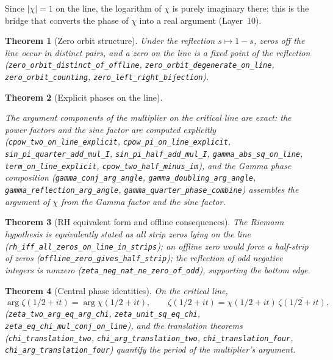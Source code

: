 \documentclass{article}
\newtheorem{theorem}{Theorem}[section]
\newcommand{\zt}{\zeta}
\newcommand{\Xchi}{\chi}
\begin{document}
Since $|\Xchi|=1$ on the line, the logarithm of $\Xchi$ is purely imaginary
there; this is the bridge that converts the phase of $\Xchi$ into a real
argument (Layer~10).

\begin{theorem}[Zero orbit structure]
\label{thm:orbit}
Under the reflection $s\mapsto 1-s$, zeros off the line occur in distinct
pairs, and a zero on the line is a fixed point of the reflection
(\texttt{zero\_orbit\_distinct\_of\_offline},
\texttt{zero\_orbit\_degenerate\_on\_line}, \texttt{zero\_orbit\_counting},
\texttt{zero\_left\_right\_bijection}).
\end{theorem}

\begin{theorem}[Explicit phases on the line]
\label{thm:explicit}
\begin{sloppypar}The argument components of the multiplier on the critical
line are exact: the power factors and the sine factor are computed
explicitly
(\texttt{cpow\_two\_on\_line\_explicit}, \texttt{cpow\_pi\_on\_line\_explicit},
\texttt{sin\_pi\_quarter\_add\_mul\_I}, \texttt{sin\_pi\_half\_add\_mul\_I},
\texttt{gamma\_abs\_sq\_on\_line}, \texttt{term\_on\_line\_explicit},
\texttt{cpow\_two\_half\_minus\_im}), and the Gamma phase composition
(\texttt{gamma\_conj\_arg\_angle}, \texttt{gamma\_doubling\_arg\_angle},
\texttt{gamma\_reflection\_arg\_angle}, \texttt{gamma\_quarter\_phase\_combine})
assembles the argument of $\Xchi$ from the Gamma factor and the sine
factor.\end{sloppypar}
\end{theorem}

\begin{theorem}[RH equivalent form and offline consequences]
\label{thm:rheq}
The Riemann hypothesis is equivalently stated as all strip zeros lying on
the line (\texttt{rh\_iff\_all\_zeros\_on\_line\_in\_strips}); an offline
zero would force a half-strip of zeros
(\texttt{offline\_zero\_gives\_half\_strip}); the reflection of odd
negative integers is nonzero (\texttt{zeta\_neg\_nat\_ne\_zero\_of\_odd}),
supporting the bottom edge.
\end{theorem}

\begin{theorem}[Central phase identities]
\label{thm:phaseid}
On the critical line,
\begin{equation}
\label{eq:phase}
\arg\zt(1/2+it)=\arg\Xchi(1/2+it),\qquad
\zt(1/2+it)=\Xchi(1/2+it)\,\overline{\zt(1/2+it)},
\end{equation}
(\texttt{zeta\_two\_arg\_eq\_arg\_chi}, \texttt{zeta\_unit\_sq\_eq\_chi},
\texttt{zeta\_eq\_chi\_mul\_conj\_on\_line}), and the translation theorems
(\texttt{chi\_translation\_two}, \texttt{chi\_arg\_translation\_two},
\texttt{chi\_translation\_four}, \texttt{chi\_arg\_translation\_four})
quantify the period of the multiplier's argument.
\end{theorem}
\end{document}
